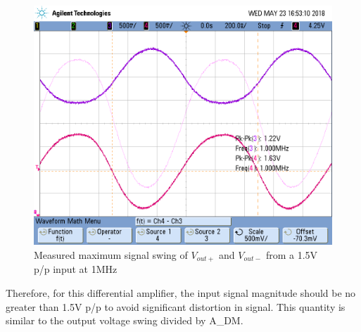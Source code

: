 \FloatBarrier

\begin{figure}[h!]
	\centering
	\includegraphics[scale=0.60]{./images/scope_6}
	\caption{Measured maximum signal swing of $V_{out+}$ and $V_{out-}$ from a 1.5\si{\volt} p/p input at 1MHz}
	\label{fig:scope_6}
\end{figure}

\FloatBarrier

Therefore, for this differential amplifier, the input signal magnitude should be no greater than 1.5V p/p to avoid significant distortion in signal.
This quantity is similar to the output voltage swing divided by A_{DM}.